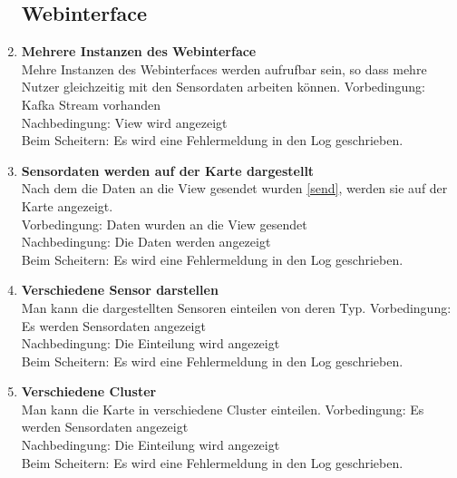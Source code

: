 \begin{enumerate}[label=\textbf{PF\arabic{enumi}0}]
 
	 \subsection{Webinterface}
	 
	 \item \textbf{Mehrere Instanzen des Webinterface}\\
		 Mehre Instanzen des Webinterfaces werden aufrufbar sein, so dass mehre Nutzer gleichzeitig mit den Sensordaten arbeiten können.
		 Vorbedingung: Kafka Stream vorhanden\\
		 Nachbedingung: View wird angezeigt\\ 
	 	Beim Scheitern: Es wird eine Fehlermeldung in den Log geschrieben.

	 \item \textbf{Sensordaten werden auf der Karte dargestellt }\\
	 	Nach dem die Daten an die View gesendet wurden \ref{send}, werden sie auf der Karte angezeigt.\\
	 	Vorbedingung: Daten wurden an die View gesendet \\
	 	Nachbedingung: Die Daten werden angezeigt \\ 
	 	Beim Scheitern: Es wird eine Fehlermeldung in den Log geschrieben.
	 
	 \item \textbf{Verschiedene Sensor darstellen}\\
	 	Man kann die dargestellten Sensoren einteilen von deren Typ.
	 	Vorbedingung: Es werden Sensordaten angezeigt\\
	 	Nachbedingung: Die Einteilung wird angezeigt \\ 
	 	Beim Scheitern: Es wird eine Fehlermeldung in den Log geschrieben.
	 
	 \item \textbf{Verschiedene Cluster}\\
	 	Man kann die Karte in verschiedene Cluster einteilen.
	 	Vorbedingung: Es werden Sensordaten angezeigt\\
	 	Nachbedingung: Die Einteilung wird angezeigt \\ 
	 	Beim Scheitern: Es wird eine Fehlermeldung in den Log geschrieben.
		

\end{enumerate}
